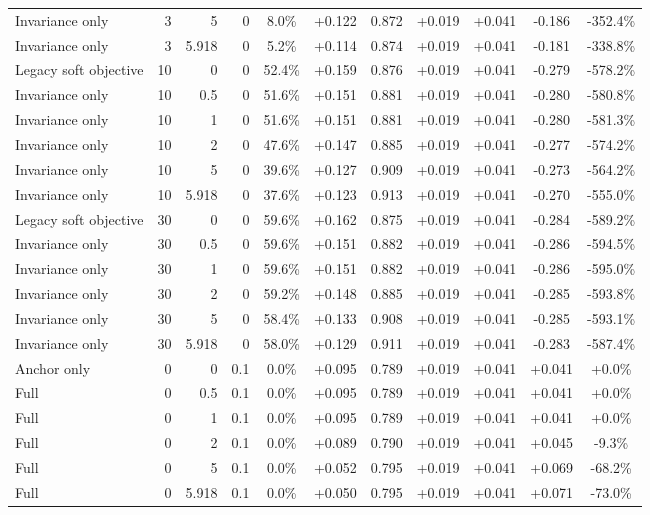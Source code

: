 \begin{table}[htbp]
\begin{tabular}{lrrrccccccc}
Invariance only & 3 & 5 & 0 & 8.0\% & +0.122 & 0.872 & +0.019 & +0.041 & -0.186 & -352.4\% \\
Invariance only & 3 & 5.918 & 0 & 5.2\% & +0.114 & 0.874 & +0.019 & +0.041 & -0.181 & -338.8\% \\
Legacy soft objective & 10 & 0 & 0 & 52.4\% & +0.159 & 0.876 & +0.019 & +0.041 & -0.279 & -578.2\% \\
Invariance only & 10 & 0.5 & 0 & 51.6\% & +0.151 & 0.881 & +0.019 & +0.041 & -0.280 & -580.8\% \\
Invariance only & 10 & 1 & 0 & 51.6\% & +0.151 & 0.881 & +0.019 & +0.041 & -0.280 & -581.3\% \\
Invariance only & 10 & 2 & 0 & 47.6\% & +0.147 & 0.885 & +0.019 & +0.041 & -0.277 & -574.2\% \\
Invariance only & 10 & 5 & 0 & 39.6\% & +0.127 & 0.909 & +0.019 & +0.041 & -0.273 & -564.2\% \\
Invariance only & 10 & 5.918 & 0 & 37.6\% & +0.123 & 0.913 & +0.019 & +0.041 & -0.270 & -555.0\% \\
Legacy soft objective & 30 & 0 & 0 & 59.6\% & +0.162 & 0.875 & +0.019 & +0.041 & -0.284 & -589.2\% \\
Invariance only & 30 & 0.5 & 0 & 59.6\% & +0.151 & 0.882 & +0.019 & +0.041 & -0.286 & -594.5\% \\
Invariance only & 30 & 1 & 0 & 59.6\% & +0.151 & 0.882 & +0.019 & +0.041 & -0.286 & -595.0\% \\
Invariance only & 30 & 2 & 0 & 59.2\% & +0.148 & 0.885 & +0.019 & +0.041 & -0.285 & -593.8\% \\
Invariance only & 30 & 5 & 0 & 58.4\% & +0.133 & 0.908 & +0.019 & +0.041 & -0.285 & -593.1\% \\
Invariance only & 30 & 5.918 & 0 & 58.0\% & +0.129 & 0.911 & +0.019 & +0.041 & -0.283 & -587.4\% \\
Anchor only & 0 & 0 & 0.1 & 0.0\% & +0.095 & 0.789 & +0.019 & +0.041 & +0.041 & +0.0\% \\
Full & 0 & 0.5 & 0.1 & 0.0\% & +0.095 & 0.789 & +0.019 & +0.041 & +0.041 & +0.0\% \\
Full & 0 & 1 & 0.1 & 0.0\% & +0.095 & 0.789 & +0.019 & +0.041 & +0.041 & +0.0\% \\
Full & 0 & 2 & 0.1 & 0.0\% & +0.089 & 0.790 & +0.019 & +0.041 & +0.045 & -9.3\% \\
Full & 0 & 5 & 0.1 & 0.0\% & +0.052 & 0.795 & +0.019 & +0.041 & +0.069 & -68.2\% \\
Full & 0 & 5.918 & 0.1 & 0.0\% & +0.050 & 0.795 & +0.019 & +0.041 & +0.071 & -73.0\% \\

\end{tabular}
\end{table}
